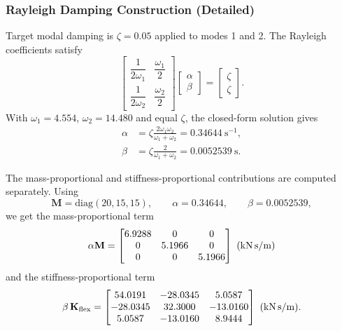 \documentclass[12pt,a4paper]{article}
\newcommand{\mat}[1]{\mathbf{#1}}
\begin{document}
\subsubsection*{Rayleigh Damping Construction (Detailed)}
Target modal damping is $\zeta=0.05$ applied to modes 1 and 2. The Rayleigh coefficients satisfy
\begin{equation}
  \begin{bmatrix}\dfrac{1}{2\omega_1} & \dfrac{\omega_1}{2}\\[4pt]\dfrac{1}{2\omega_2} & \dfrac{\omega_2}{2}\end{bmatrix}\begin{bmatrix}\alpha\\\beta\end{bmatrix}=\begin{bmatrix}\zeta\\\zeta\end{bmatrix}.
\end{equation}
With $\omega_1=4.554$, $\omega_2=14.480$ and equal $\zeta$, the closed-form solution gives
\begin{align}
  \alpha &= \zeta\frac{2\omega_1\omega_2}{\omega_1+\omega_2} = 0.34644~\text{s}^{-1},\\
  \beta  &= \zeta\frac{2}{\omega_1+\omega_2} = 0.0052539~\text{s}.
\end{align}

The mass-proportional and stiffness-proportional contributions are computed separately. Using
\begin{equation}
  \mat{M}=\mathrm{diag}(20,15,15),\qquad \alpha=0.34644,\qquad \beta=0.0052539,
\end{equation}
we get the mass-proportional term
\begin{equation}
  \alpha\mat{M} = \begin{bmatrix}6.9288 & 0 & 0\\0 & 5.1966 & 0\\0 & 0 & 5.1966\end{bmatrix}~(\text{kN\,s/m})
\end{equation}
and the stiffness-proportional term
\begin{equation}
  \beta\,\mat{K}_{\text{flex}} = \begin{bmatrix}54.0191 & -28.0345 & 5.0587\\-28.0345 & 32.3000 & -13.0160\\5.0587 & -13.0160 & 8.9444\end{bmatrix}~(\text{kN\,s/m}).
\end{equation}
\end{document}
